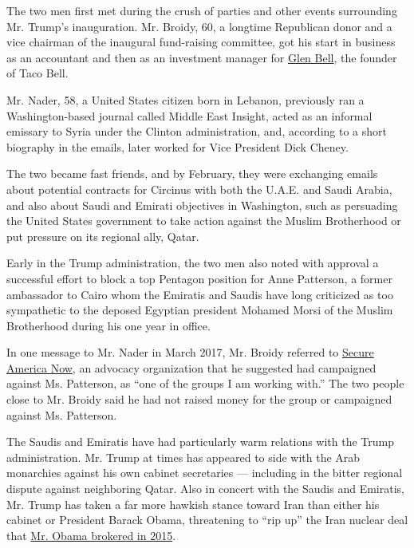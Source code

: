 The two men first met during the crush of parties and other events
surrounding Mr. Trump's inauguration. Mr. Broidy, 60, a longtime
Republican donor and a vice chairman of the inaugural fund-raising
committee, got his start in business as an accountant and then as an
investment manager for
\href{https://www.nytimes.com/2010/01/19/business/19bell.html}{Glen
Bell}, the founder of Taco Bell.

Mr. Nader, 58, a United States citizen born in Lebanon, previously ran a
Washington-based journal called Middle East Insight, acted as an
informal emissary to Syria under the Clinton administration, and,
according to a short biography in the emails, later worked for Vice
President Dick Cheney.

The two became fast friends, and by February, they were exchanging
emails about potential contracts for Circinus with both the U.A.E. and
Saudi Arabia, and also about Saudi and Emirati objectives in Washington,
such as persuading the United States government to take action against
the Muslim Brotherhood or put pressure on its regional ally, Qatar.

Early in the Trump administration, the two men also noted with approval
a successful effort to block a top Pentagon position for Anne Patterson,
a former ambassador to Cairo whom the Emiratis and Saudis have long
criticized as too sympathetic to the deposed Egyptian president Mohamed
Morsi of the Muslim Brotherhood during his one year in office.

In one message to Mr. Nader in March 2017, Mr. Broidy referred to
\href{https://www.secureamericanow.org/home}{Secure America Now}, an
advocacy organization that he suggested had campaigned against Ms.
Patterson, as ``one of the groups I am working with.'' The two people
close to Mr. Broidy said he had not raised money for the group or
campaigned against Ms. Patterson.

The Saudis and Emiratis have had particularly warm relations with the
Trump administration. Mr. Trump at times has appeared to side with the
Arab monarchies against his own cabinet secretaries --- including in the
bitter regional dispute against neighboring Qatar. Also in concert with
the Saudis and Emiratis, Mr. Trump has taken a far more hawkish stance
toward Iran than either his cabinet or President Barack Obama,
threatening to ``rip up'' the Iran nuclear deal that
\href{https://www.nytimes.com/2015/07/15/world/middleeast/iran-nuclear-deal-is-reached-after-long-negotiations.html}{Mr.
Obama brokered in 2015}.

